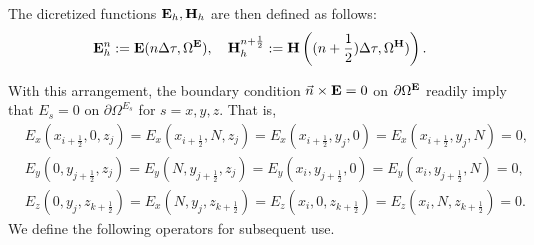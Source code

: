 \documentclass[12pt,reqno]{amsart}
\newcommand{\e}{{\bf E}}
\newcommand{\h}{{\bf H}}
\theoremstyle{definition}
\numberwithin{equation}{section}
\def\Gw{\Omega}     \def\Gx{\Xi}         \def\Gy{\Psi}
\begin{document}
    The dicretized functions $\e_h, \h_h$ are then defined as follows:
    $$
    \e_h^n:=\e(n\Delta \tau,\Gw^\e),\quad  \h_h^{n+\frac{1}{2}}:=\h\left ((n+\frac{1}{2})\Delta \tau,\Gw^\h)\right).
    $$

	With this arrangement, the boundary condition 
	$\vec{n}\times {\bf E}=0$ on $\partial \Gw^{{\bf E}}$ readily imply that 
	$E_s=0$ on $\partial \Gw^{E_s}$ for $s=x,y,z$. That is, 
	\begin{align*}
		&
		E_x(x_{i+\frac{1}{2}},0,z_j)=E_x(x_{i+\frac{1}{2}},N,z_j)=
		E_x(x_{i+\frac{1}{2}},y_j,0)=E_x(x_{i+\frac{1}{2}},y_j, N)=0, \\&
		E_y(0,y_{j+\frac{1}{2}},z_j)=E_y(N,y_{j+\frac{1}{2}},z_j)=
		E_y(x_i,y_{j+\frac{1}{2}},0)=E_y(x_i, y_{j+\frac{1}{2}}, N)=0, \\&
		E_z(0,y_j,z_{k+\frac{1}{2}})=E_x(N,y_j,z_{k+\frac{1}{2}})=
		E_z(x_i,0,z_{k+\frac{1}{2}})=E_z(x_i,N,z_{k+\frac{1}{2}})=0. &
	\end{align*} 
	We define the following operators for subsequent use.
	
\end{document}
